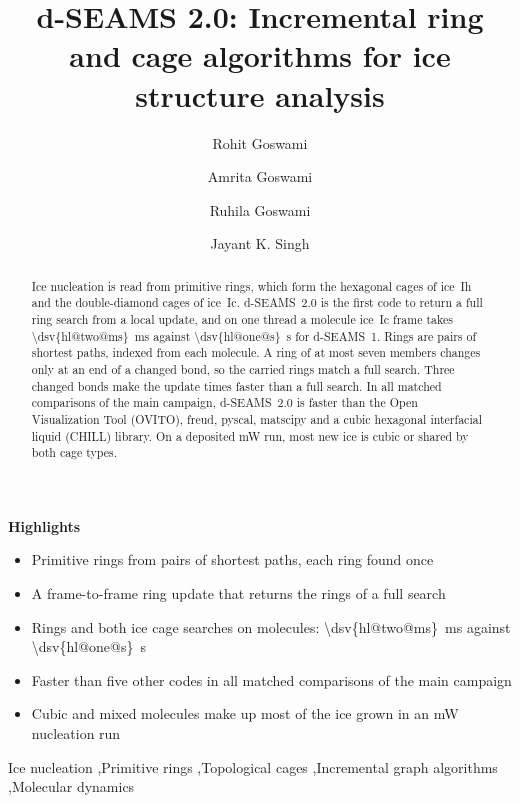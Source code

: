 \documentclass[preprint,12pt]{elsarticle}
\newenvironment{highlights}{\par\noindent\textbf{Highlights}\begin{itemize}}{\end{itemize}}}{}
\begin{document}
\begin{frontmatter}
\title{d-SEAMS 2.0: Incremental ring and cage algorithms for ice structure analysis}

\author[iitk]{Rohit Goswami}
\author[iitk]{Amrita Goswami}
\author[hi-life]{Ruhila Goswami}
\author[iitk]{Jayant K. Singh}
\address[iitk]{Department of Chemical Engineering, Indian Institute of Technology Kanpur, Kanpur 208016, Uttar Pradesh, India}
\address[hi-life]{Faculty of Life and Environmental Sciences, University of Iceland, Reykjavik, Iceland}

\begin{abstract}
Ice nucleation is read from primitive rings, which form the hexagonal cages of ice~Ih and the double-diamond cages of ice~Ic.
d-SEAMS~2.0 is the first code to return a full ring search from a local update, and on one thread a  molecule ice~Ic frame takes \qty{\dsv{hl@two@ms}}{\milli\second} against \qty{\dsv{hl@one@s}}{\second} for d-SEAMS~1.
Rings are pairs of shortest paths, indexed from each molecule.
A ring of at most seven members changes only at an end of a changed bond, so the carried rings match a full search.
Three changed bonds make the update  times faster than a full search.
In all  matched comparisons of the main campaign, d-SEAMS~2.0 is faster than the Open Visualization Tool (OVITO), freud, pyscal, matscipy and a cubic hexagonal interfacial liquid (CHILL) library.
On a deposited mW run, most new ice is cubic or shared by both cage types.
\end{abstract}

\begin{highlights}
\item Primitive rings from pairs of shortest paths, each ring found once
\item A frame-to-frame ring update that returns the rings of a full search
\item Rings and both ice cage searches on  molecules: \qty{\dsv{hl@two@ms}}{\milli\second} against \qty{\dsv{hl@one@s}}{\second}
\item Faster than five other codes in all  matched comparisons of the main campaign
\item Cubic and mixed molecules make up most of the ice grown in an mW nucleation run
\end{highlights}

\begin{keyword}
Ice nucleation \sep Primitive rings \sep Topological cages \sep Incremental graph algorithms \sep Molecular dynamics
\end{keyword}
\end{frontmatter}
\end{document}
